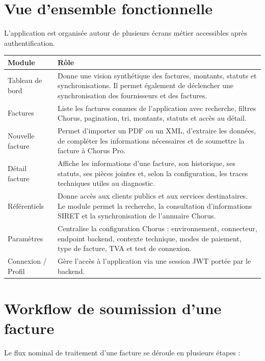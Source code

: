 \documentclass[11pt,a4paper]{article}
\begin{document}
\section{Vue d'ensemble fonctionnelle}

L'application est organisée autour de plusieurs écrans métier accessibles après
authentification.

\begin{longtable}{|p{}|p{}|}
  \hline
  \textbf{Module} & \textbf{Rôle} \\
  \hline
  Tableau de bord &
  Donne une vision synthétique des factures, montants, statuts et synchronisations.
  Il permet également de déclencher une synchronisation des fournisseurs et des
  factures. \\
  \hline
  Factures &
  Liste les factures connues de l'application avec recherche, filtres Chorus,
  pagination, tri, montants, statuts et accès au détail. \\
  \hline
  Nouvelle facture &
  Permet d'importer un PDF ou un XML, d'extraire les données, de compléter les
  informations nécessaires et de soumettre la facture à Chorus Pro. \\
  \hline
  Détail facture &
  Affiche les informations d'une facture, son historique, ses statuts, ses pièces
  jointes et, selon la configuration, les traces techniques utiles au diagnostic. \\
  \hline
  Référentiels &
  Donne accès aux clients publics et aux services destinataires. Le module permet
  la recherche, la consultation d'informations SIRET et la synchronisation de
  l'annuaire Chorus. \\
  \hline
  Paramètres &
  Centralise la configuration Chorus : environnement, connecteur, endpoint backend,
  contexte technique, modes de paiement, type de facture, TVA et test de connexion. \\
  \hline
  Connexion / Profil &
  Gère l'accès à l'application via une session JWT portée par le backend. \\
  \hline
\end{longtable}

\section{Workflow de soumission d'une facture}

Le flux nominal de traitement d'une facture se déroule en plusieurs étapes :
\end{document}
